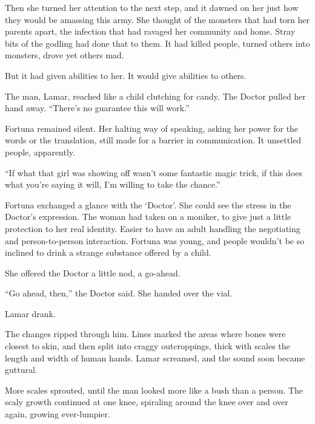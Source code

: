 Then she turned her attention to the next step, and it dawned on her just how they would be amassing this army.  She thought of the monsters that had torn her parents apart, the infection that had ravaged her community and home.  Stray bits of the godling had done that to them.  It had killed people, turned others into monsters, drove yet others mad.



But it had given abilities to her.  It would give abilities to others.



\sectionbreak



The man, Lamar, reached like a child clutching for candy.  The Doctor pulled her hand away.  ``There's no guarantee this will work.''



Fortuna remained silent.  Her halting way of speaking, asking her power for the words or the translation, still made for a barrier in communication.  It unsettled people, apparently.



``If what that girl was showing off wasn't some fantastic magic trick, if this does what you're saying it will, I'm willing to take the chance.''



Fortuna exchanged a glance with the `Doctor'.  She could see the stress in the Doctor's expression.  The woman had taken on a moniker, to give just a little protection to her real identity.  Easier to have an adult handling the negotiating and person-to-person interaction.  Fortuna was young, and people wouldn't be so inclined to drink a strange substance offered by a child.



She offered the Doctor a little nod, a go-ahead.



``Go ahead, then,'' the Doctor said.  She handed over the vial.



Lamar drank.



The changes ripped through him.  Lines marked the areas where bones were closest to skin, and then split into craggy outcroppings, thick with scales the length and width of human hands.  Lamar screamed, and the sound soon became guttural.



More scales sprouted, until the man looked more like a bush than a person.  The scaly growth continued at one knee, spiraling around the knee over and over again, growing ever-lumpier.



